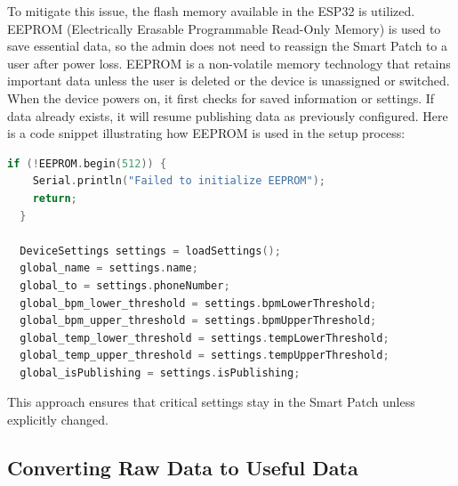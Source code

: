 \noindent To mitigate this issue, the flash memory available in the ESP32 is utilized. EEPROM (Electrically Erasable Programmable Read-Only Memory) is used to save essential data, so the admin does not need to reassign the Smart Patch to a user after power loss. EEPROM is a non-volatile memory technology that retains important data unless the user is deleted or the device is unassigned or switched.\\

\noindent When the device powers on, it first checks for saved information or settings. If data already exists, it will resume publishing data as previously configured. Here is a code snippet illustrating how EEPROM is used in the setup process:

\begin{lstlisting}[language=C++, caption={Using EEPROM in Setup()}, label={EEPROM_in_setup}]
  if (!EEPROM.begin(512)) { 
    Serial.println("Failed to initialize EEPROM");
    return;
  }

  DeviceSettings settings = loadSettings(); 
  global_name = settings.name;
  global_to = settings.phoneNumber;
  global_bpm_lower_threshold = settings.bpmLowerThreshold;
  global_bpm_upper_threshold = settings.bpmUpperThreshold;
  global_temp_lower_threshold = settings.tempLowerThreshold;
  global_temp_upper_threshold = settings.tempUpperThreshold;
  global_isPublishing = settings.isPublishing;

\end{lstlisting}

This approach ensures that critical settings stay in the Smart Patch unless explicitly changed.

\subsection{Converting Raw Data to Useful Data}

